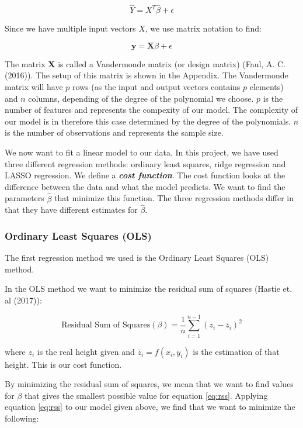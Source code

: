 \documentclass[a4paper]{article}
\begin{document}
\begin{equation*}
\hat{Y} = X^{T} \hat{\beta} + \epsilon
\end{equation*}

Since we have multiple input vectors $X$, we use matrix notation to find:

\begin{equation*}
\textbf{y} = \textbf{X} \beta + \epsilon
\end{equation*}

The matrix \textbf{X} is called a Vandermonde matrix (or design matrix) (Faul, A. C. (2016)). The setup of this matrix is shown in the Appendix. The Vandermonde matrix will have $p$ rows (as the input and output vectors contains $p$ elements) and $n$ columns, depending of the degree of the polynomial we choose. $p$ is the number of features and represents the compexity of our model. The complexity of our model is in therefore this case determined by the degree of the polynomials. $n$ is the number of observations and represents the sample size.

We now want to fit a linear model to our data. In this project, we have used three different regression methods: ordinary least squares, ridge regression and LASSO regression. We define a \textit{\textbf{cost function}}. The cost function looks at the difference between the data and what the model predicts. We want to find the parameters $\hat{\beta}$ that minimize this function. The three regression methods differ in that they have different estimates for $\hat{\beta}$. 

\subsubsection{Ordinary Least Squares (OLS)}

The first regression method we used is the Ordinary Least Squares (OLS) method. 

In the OLS method we want to minimize the residual sum of squares (Hastie et. al (2017)):

\begin{equation}
\text{Residual Sum of Squares} (\beta) = \frac{1}{n} \sum_{i = 1}^{n-1} (z_{i} - \bar{z}_{i} )^{2} \label{eq:rss}
\end{equation}

where $z_{i}$ is the real height given and $\bar{z}_{i} = f(x_{i}, y_{i})$ is the estimation of that height. This is our cost function.

By minimizing the residual sum of squares, we mean that we want to find values for $\beta$ that gives the smallest possible value for equation \ref{eq:rss}.
Applying equation \ref{eq:rss} to our model given above, we find that we want to minimize the following:
\end{document}
